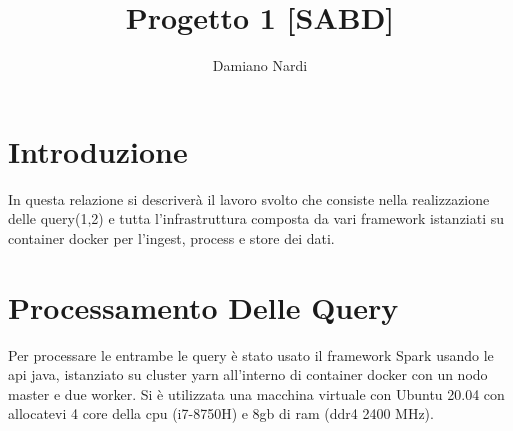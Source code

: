 \documentclass[acmsmall]{acmart}
\begin{document}
\title{Progetto 1 [SABD]}

\author{Damiano Nardi}












 \maketitle{} 

\section{Introduzione}
In questa relazione si descriverà il lavoro svolto che consiste nella realizzazione delle query(1,2) e tutta l'infrastruttura  composta da vari framework istanziati su container docker per l'ingest, process e store dei dati.


\section{Processamento Delle Query}
Per processare le entrambe le query è stato usato il framework Spark usando le api java, istanziato su cluster yarn all'interno di container docker con un nodo master e due worker.
Si è utilizzata una macchina virtuale con Ubuntu 20.04 con allocatevi 4 core della cpu (i7-8750H) e 8gb di ram (ddr4 2400 MHz).
\end{document}
